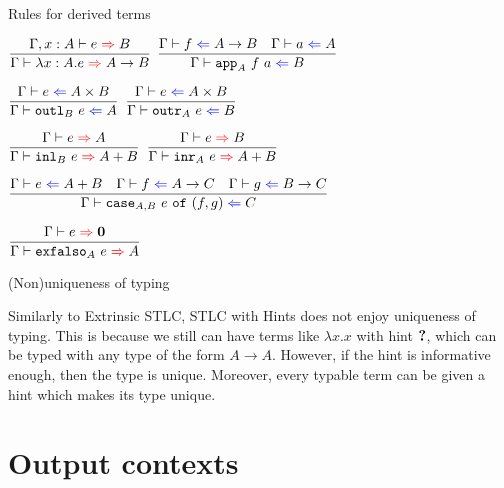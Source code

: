 \documentclass{beamer}
\newcommand{\Fun}[2]{#1 \to #2}
\newcommand{\Prod}[2]{#1 \times #2}
\newcommand{\Sum}[2]{#1 + #2}
\newcommand{\Empty}{\textbf{0}}
\newcommand{\fun}[2]{\lambda #1. #2}
\newcommand{\rulename}[1]{\textsc{\footnotesize{#1}}}
\newcommand{\infrule}[3][]{\displaystyle \frac{#2}{#3} \rulename{#1}}
\newcommand{\extend}[3]{#1, #2 : #3}
\begin{document}
\begin{frame}{Rules for derived terms}

\begin{center}
  $\infrule{\fullinfer{\extend{\Gamma}{x}{A}}{e}{B}}{\infer{\ifun{x}{A}{e}}{\Fun{A}{B}}}$ \quad
  $\infrule{\check{f}{\Fun{A}{B}} \quad \check{a}{A}}{\check{\iapp{A}{f}{a}}{B}}$

  \vspace{2em}

  $\infrule{\check{e}{\Prod{A}{B}}}{\check{\ioutl{B}{e}}{A}}$ \enspace
  $\infrule{\check{e}{\Prod{A}{B}}}{\check{\ioutr{A}{e}}{B}}$

  \vspace{2em}

  $\infrule{\infer{e}{A}}{\infer{\iinl{B}{e}}{\Sum{A}{B}}}$ \quad
  $\infrule{\infer{e}{B}}{\infer{\iinr{A}{e}}{\Sum{A}{B}}}$

  \vspace{2em}

  $\infrule{\check{e}{\Sum{A}{B}} \quad \check{f}{\Fun{A}{C}} \quad \check{g}{\Fun{B}{C}}}{\check{\icase{A}{B}{e}{f}{g}}{C}}$

  \vspace{2em}

  $\infrule{\infer{e}{\Empty}}{\infer{\iexfalso{A}{e}}{A}}$
\end{center}

\end{frame}

\begin{frame}{(Non)uniqueness of typing}

Similarly to Extrinsic STLC, STLC with Hints does not enjoy uniqueness of typing. This is because we still can have terms like $\fun{x}{x}$ with hint $\textbf{?}$, which can be typed with any type of the form $\Fun{A}{A}$. However, if the hint is informative enough, then the type is unique. Moreover, every typable term can be given a hint which makes its type unique.

\end{frame}

\section{Output contexts}

\newcommand{\fulloutctx}[5]{#1 \vdash #2 \mathcolor{blue}{\Leftarrow} #3 \mathcolor{red}{\Rightarrow} #4 \dashv #5}
\newcommand{\outctx}[3]{\fulloutctx{\Gamma}{#1}{#2}{#3}{\Gamma'}}
\newcommand{\shortoutctx}[3]{#1 \mathcolor{blue}{\Leftarrow} #2 \mathcolor{red}{\Rightarrow} #3}
\end{document}
